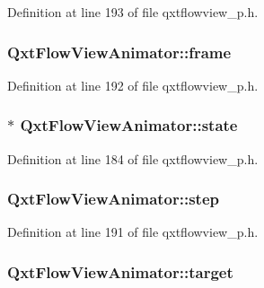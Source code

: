 Definition at line 193 of file qxtflowview\-\_\-p.\-h.

\hypertarget{class_qxt_flow_view_animator_a3df3c0e20eecab444f9eb0987bc71215}{
\subsubsection[{frame}]{ Qxt\-Flow\-View\-Animator\-::frame}}\label{class_qxt_flow_view_animator_a3df3c0e20eecab444f9eb0987bc71215}


Definition at line 192 of file qxtflowview\-\_\-p.\-h.

\hypertarget{class_qxt_flow_view_animator_a8d82b13102602cd1bb1cc957a905edca}{
\subsubsection[{state}]{$\ast$ Qxt\-Flow\-View\-Animator\-::state}}\label{class_qxt_flow_view_animator_a8d82b13102602cd1bb1cc957a905edca}


Definition at line 184 of file qxtflowview\-\_\-p.\-h.

\hypertarget{class_qxt_flow_view_animator_aafa502939797de9ae1b1ff90d1743e04}{
\subsubsection[{step}]{ Qxt\-Flow\-View\-Animator\-::step}}\label{class_qxt_flow_view_animator_aafa502939797de9ae1b1ff90d1743e04}


Definition at line 191 of file qxtflowview\-\_\-p.\-h.

\hypertarget{class_qxt_flow_view_animator_aaba6d75ee259eaa348df1753522f98c3}{
\subsubsection[{target}]{ Qxt\-Flow\-View\-Animator\-::target}}\label{class_qxt_flow_view_animator_aaba6d75ee259eaa348df1753522f98c3}


